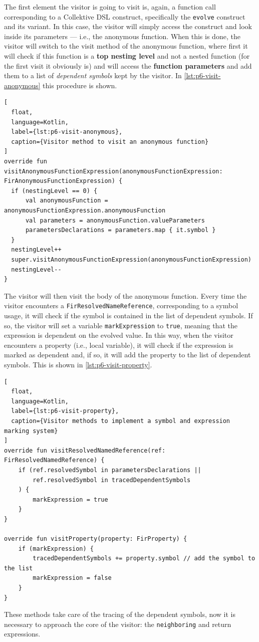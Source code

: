 \documentclass[12pt,a4paper,openright,twoside]{book}
\begin{document}
The first element the visitor is going to visit is, again, a function call
corresponding to a Collektive \ac{DSL} construct, specifically the
\lstinline{evolve} construct and its variant. In this case, the visitor will
simply access the construct and look inside its parameters --- i.e., the 
anonymous function. 
%
When this is done, the visitor will switch to the visit
method of the anonymous function, where first it will check if this function
is a \textbf{top nesting level} and not a nested function (for the first 
visit it obviously is) and will access the \textbf{function parameters} and
add them to a list of \emph{dependent symbols} kept by the visitor.
%
In \cref{lst:p6-visit-anonymous} this procedure is shown.
%
\begin{lstlisting}[
  float, 
  language=Kotlin,
  label={lst:p6-visit-anonymous},
  caption={Visitor method to visit an anonymous function}
] 
override fun visitAnonymousFunctionExpression(anonymousFunctionExpression: FirAnonymousFunctionExpression) {
  if (nestingLevel == 0) {
      val anonymousFunction = anonymousFunctionExpression.anonymousFunction
      val parameters = anonymousFunction.valueParameters
      parametersDeclarations = parameters.map { it.symbol }
  }
  nestingLevel++
  super.visitAnonymousFunctionExpression(anonymousFunctionExpression)
  nestingLevel--
}
\end{lstlisting}
%
The visitor will then visit the body of the anonymous function. Every time the
visitor encounters a \lstinline{FirResolvedNameReference}, corresponding to a
symbol usage, it will check if the symbol is contained in the list of dependent
symbols. If so, the visitor will set a variable \lstinline{markExpression} to
\lstinline{true}, meaning that the expression is dependent on the evolved value.
%
In this way, when the visitor encounters a property (i.e., local variable), it
will check if the expression is marked as dependent and, if so, it will add the
property to the list of dependent symbols. This is shown in
\cref{lst:p6-visit-property}.
%
\begin{lstlisting}[
  float, 
  language=Kotlin,
  label={lst:p6-visit-property},
  caption={Visitor methods to implement a symbol and expression marking system}
]
override fun visitResolvedNamedReference(ref: FirResolvedNamedReference) {
    if (ref.resolvedSymbol in parametersDeclarations ||
        ref.resolvedSymbol in tracedDependentSymbols
    ) {
        markExpression = true
    }
}

override fun visitProperty(property: FirProperty) {
    if (markExpression) {
        tracedDependentSymbols += property.symbol // add the symbol to the list
        markExpression = false
    }
}
\end{lstlisting}
%
These methods take care of the tracing of the dependent symbols, now it is
necessary to approach the core of the visitor: the \lstinline{neighboring} and
return expressions. 
\end{document}
